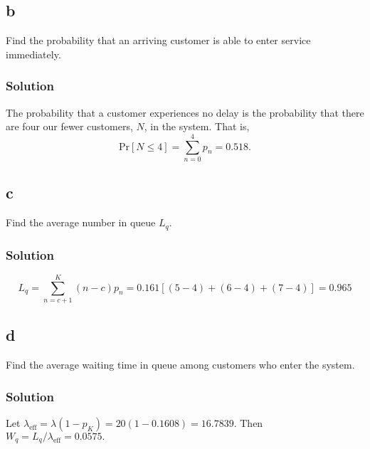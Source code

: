 \documentclass[letterpaper]{amsart}
\begin{document}
\subsection*{b}
Find the probability that an arriving customer is able to enter service
immediately.
\subsubsection*{Solution}
The probability that a customer experiences no delay is the probability that
there are four our fewer customers, $N$, in the system. That is,
\begin{equation*}
  \text{Pr}[N\leq 4] = \sum_{n=0}^4 p_n = 0.518.
\end{equation*}

\subsection*{c}
Find the average number in queue $L_q$.
\subsubsection*{Solution}
\begin{equation*}
  L_q = \sum_{n=c+1}^K(n-c)p_n
  = 0.161\left[(5-4)+(6-4)+(7-4)\right]
  = 0.965
\end{equation*}
\subsection*{d}
Find the average waiting time in queue among customers who enter the
system.
\subsubsection*{Solution}
Let $\lambda_\text{eff} = \lambda(1-p_K) = 20(1-0.1608) = 16.7839$.
Then $W_q = L_q/\lambda_\text{eff} = 0.0575.$
\end{document}
